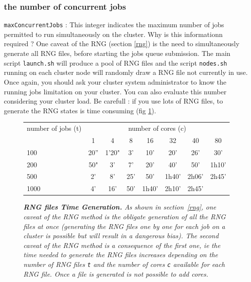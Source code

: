 \subsubsection{the number of concurrent jobs}
\texttt{maxConcurrentJobs} : This integer indicates the maximum number of jobs permitted to run simultaneously on the cluster. Why is this informationn required ? One caveat of the RNG (section \ref{rng}) is the need to simultaneously generate all RNG files, before starting the jobs queue submission. The main script \texttt{launch.sh} will produce a pool of RNG files and the script \texttt{nodes.sh} running on each cluster node will randomly draw a RNG file not currently in use. Once again, you should ask your cluster system administrator to know the running jobs limitation on your cluster. You can also evaluate this number considering your cluster load. Be carefull : if you use lots of RNG files, to generate the RNG states is time consuming (fig \ref{fig:rngTimeGeneration}).


\begin{figure}[htb]
\centering \it	
  \begin{tabular}{|  l || c | c | c | c | c | c | c | }
	   \hline
	   number of jobs (t) & \multicolumn{7}{c|}{number of cores (c)} \\
	          & 1 & 4   & 8     & 16 & 32 & 40 & 80 \\
	   \hline \hline
	   100 & 20''  & 1'20" & 3'  & 10'   & 20'   & 26'   & 30' \\
	   \hline
	   200 & 50" & 3'    & 7'  & 20'   & 40'   & 50'   & 1h10' \\
	   \hline
	   500 & 2'  & 8'    & 25' & 50'   & 1h40' & 2h06' & 2h45' \\
	   \hline
	   1000 & 4' & 16'   & 50' & 1h40' & 2h10' & 2h45' & \\
	   \hline
   \end{tabular}
  \caption[width=.6\textwidth]{\label{fig:rngTimeGeneration} \it\footnotesize
    \textbf{RNG files Time Generation.} As shown in section~\ref{rng}, one caveat of the RNG
    method is the obligate generation of all the RNG files at once (generating the RNG files one by one 
    for each job on a cluster is possible but will result in a dangerous bias). The second
    caveat of the RNG method is a consequence of the first one, ie the time needed to generate the RNG
    files increases depending on the number of RNG files \texttt{t} and the number of cores \texttt{c}
    available for each RNG file. Once a file is generated is not possible to add cores. }
\end{figure}


